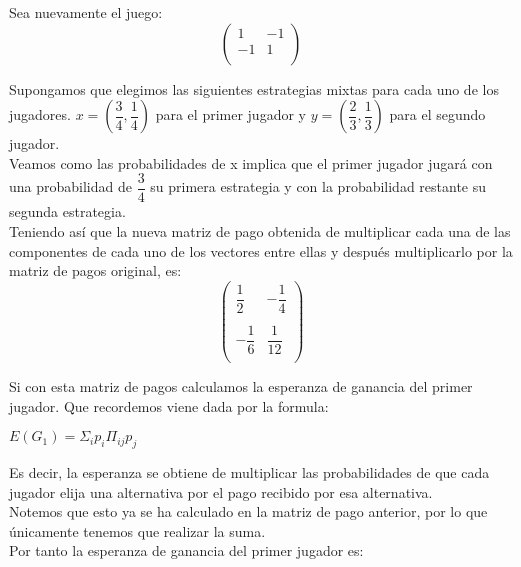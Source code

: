 \documentclass[10pt,a4paper]{book}
\begin{document}
Sea nuevamente el juego:\\


$$
\left(
\begin{array}{cccc}
1 & -1  \\
-1 & 1 \\

\end{array}
\right)
$$

Supongamos que elegimos las siguientes estrategias mixtas para cada uno de los jugadores. $x=(\dfrac{3}{4},\dfrac{1}{4})$ para el primer jugador y $y=(\dfrac{2}{3},\dfrac{1}{3})$ para el segundo jugador. \\
Veamos como las probabilidades de x implica que el primer jugador jugará con una probabilidad de $\dfrac{3}{4}$  su primera estrategia y con la probabilidad restante su segunda estrategia.\\
Teniendo así que la nueva matriz de pago obtenida de multiplicar cada una de las componentes de cada uno de los vectores entre ellas y después multiplicarlo por la matriz de pagos original, es:\\


$$
\left(
\begin{array}{cccc}
\dfrac{1}{2} &  -\dfrac{1}{4} \\
\\
-\dfrac{1}{6} & \dfrac{1}{12} \\

\end{array}
\right)
$$

Si con esta matriz de pagos calculamos la esperanza de ganancia del primer jugador. Que recordemos viene dada por la formula:\\

\begin{center}

$ E(G_1)=\Sigma_i p_i\Pi_{ij}p_j$

\end{center}

Es decir, la esperanza se obtiene de multiplicar las probabilidades de que cada jugador elija una alternativa por el pago recibido por esa alternativa.\\

Notemos que esto ya se ha calculado en la matriz de pago anterior, por lo que únicamente tenemos que realizar la suma.\\

Por tanto la esperanza de ganancia del primer jugador es:\\
\end{document}
